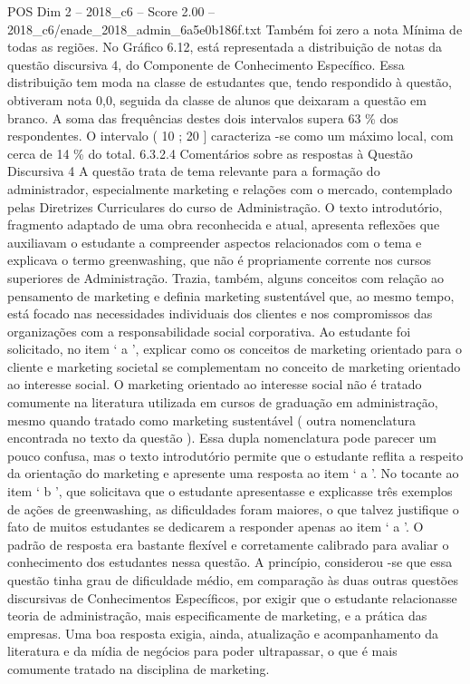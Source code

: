 \begin{textsample}{POS Dim 2 – 2018\_c6 – Score 2.00 – 2018\_c6/enade\_2018\_admin\_6a5e0b186f.txt}
Também foi zero a nota Mínima de todas as regiões.
No Gráfico 6.12, está representada a distribuição de notas da questão discursiva 4, do Componente de Conhecimento Específico.
Essa distribuição tem moda na classe de estudantes que, tendo respondido à questão, obtiveram nota 0,0, seguida da classe de alunos que deixaram a questão em branco.
A soma das frequências destes dois intervalos supera 63 \% dos respondentes.
O intervalo ( 10 ; 20 ] caracteriza -se como um máximo local, com cerca de 14 \% do total. 6.3.2.4 Comentários sobre as respostas à Questão Discursiva 4 A questão trata de tema relevante para a formação do administrador, especialmente marketing e relações com o mercado, contemplado pelas Diretrizes Curriculares do curso de Administração.
O texto introdutório, fragmento adaptado de uma obra reconhecida e atual, apresenta reflexões que auxiliavam o estudante a compreender aspectos relacionados com o tema e explicava o termo greenwashing, que não é propriamente corrente nos cursos superiores de Administração.
Trazia, também, alguns conceitos com relação ao pensamento de marketing e definia marketing sustentável que, ao mesmo tempo, está focado nas necessidades individuais dos clientes e nos compromissos das organizações com a responsabilidade social corporativa.
Ao estudante foi solicitado, no item ‘ a ’, explicar como os conceitos de marketing orientado para o cliente e marketing societal se complementam no conceito de marketing orientado ao interesse social.
O marketing orientado ao interesse social não é tratado comumente na literatura utilizada em cursos de graduação em administração, mesmo quando tratado como marketing sustentável ( outra nomenclatura encontrada no texto da questão ).
Essa dupla nomenclatura pode parecer um pouco confusa, mas o texto introdutório permite que o estudante reflita a respeito da orientação do marketing e apresente uma resposta ao item ‘ a ’.
No tocante ao item ‘ b ’, que solicitava que o estudante apresentasse e explicasse três exemplos de ações de greenwashing, as dificuldades foram maiores, o que talvez justifique o fato de muitos estudantes se dedicarem a responder apenas ao item ‘ a ’.
O padrão de resposta era bastante flexível e corretamente calibrado para avaliar o conhecimento dos estudantes nessa questão.
A princípio, considerou -se que essa questão tinha grau de dificuldade médio, em comparação às duas outras questões discursivas de Conhecimentos Específicos, por exigir que o estudante relacionasse teoria de administração, mais especificamente de marketing, e a prática das empresas.
Uma boa resposta exigia, ainda, atualização e acompanhamento da literatura e da mídia de negócios para poder ultrapassar, o que é mais comumente tratado na disciplina de marketing.

\end{textsample}

